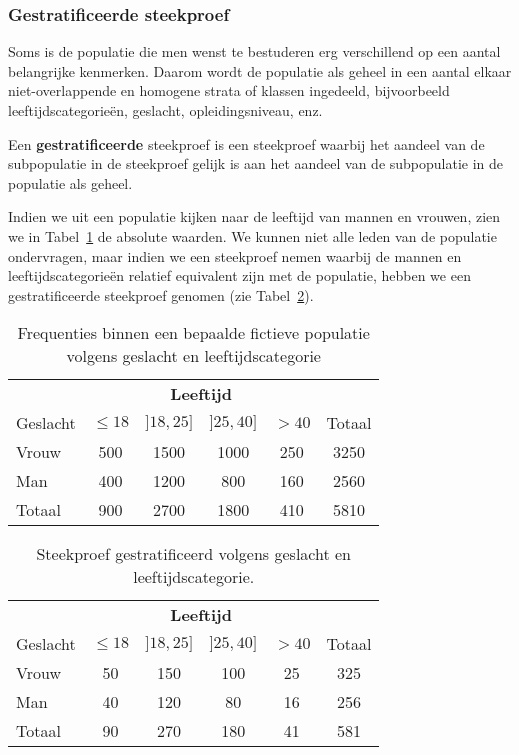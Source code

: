 \subsubsection{Gestratificeerde steekproef}

Soms is de populatie die men wenst te bestuderen erg verschillend op een aantal belangrijke kenmerken. Daarom wordt de populatie als geheel in een aantal elkaar niet-overlappende en homogene strata of klassen ingedeeld, bijvoorbeeld leeftijdscategorie\"en, geslacht, opleidingsniveau, enz.

\begin{definition}
  Een \textbf{gestratificeerde}  steekproef is een steekproef waarbij het aandeel van de subpopulatie in de steekproef gelijk is aan het aandeel van de subpopulatie in de populatie als geheel.
\end{definition}

\begin{example}
  Indien we uit een populatie kijken naar de leeftijd van  mannen en vrouwen, zien we in Tabel~\ref{tab:frequenties-populatie} de absolute waarden. We kunnen niet alle leden van de populatie ondervragen, maar indien we een steekproef nemen waarbij de mannen en leeftijdscategorie\"en relatief equivalent zijn met de populatie, hebben we een gestratificeerde steekproef genomen (zie Tabel~\ref{tab:frequenties-steekproef}).
\end{example}

\begin{table}
  \centering
  \begin{tabular}{l|cccc|c}
    & \multicolumn{4}{c|}{\textbf{Leeftijd}} & \\
    Geslacht & $\le 18$ & $]18,25]$ & $]25, 40]$ & $> 40$ & Totaal\\
    \hline
    Vrouw & 500 & 1500 & 1000 & 250 & 3250 \\
    Man   & 400 & 1200 & 800 & 160 & 2560\\
    \hline
    Totaal & 900 & 2700 & 1800 & 410 & 5810
  \end{tabular}
  \caption{Frequenties binnen een bepaalde fictieve populatie volgens geslacht en leeftijdscategorie}
  \label{tab:frequenties-populatie}
\end{table}

\begin{table}
  \centering
  \begin{tabular}{l|cccc|c}
    & \multicolumn{4}{c|}{\textbf{Leeftijd}} & \\
    Geslacht & $\le 18$ & $]18,25]$ & $]25, 40]$ & $> 40$ & Totaal\\
    \hline
    Vrouw & 50 & 150 & 100 & 25 & 325 \\
    Man   & 40 & 120 & 80 & 16 & 256\\
    \hline
    Totaal & 90 & 270 & 180 & 41 & 581
  \end{tabular}
  \caption{Steekproef gestratificeerd volgens geslacht en leeftijdscategorie.}
  \label{tab:frequenties-steekproef}
\end{table}


